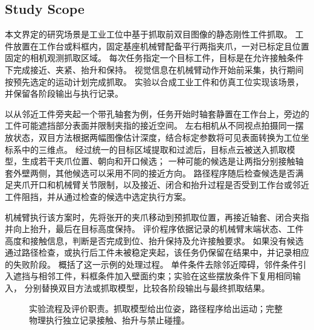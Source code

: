 \documentclass[UTF8,fontset=fandol,a4paper,11pt]{ctexart}
\newcommand{\qyb}[1]{\textcolor{red!75!black}{#1}}
\begin{document}
\subsection{\qyb{Study Scope}}

本文界定的研究场景是工业工位中基于抓取前双目图像的静态刚性工件抓取。
工件放置在工作台或料框内，固定基座机械臂配备平行两指夹爪，一对已标定且位置固定的相机观测抓取区域。
每次任务指定一个目标工件，目标是在允许接触条件下完成接近、夹紧、抬升和保持。
视觉信息在机械臂动作开始前采集，执行期间按预先选定的运动计划完成抓取。
实验以合成工业工件和仿真工位实现该场景，并保留各阶段输出与执行记录。

以从邻近工件旁夹起一个带孔轴套为例，任务开始时轴套静置在工作台上，旁边的工件可能遮挡部分表面并限制夹指的接近空间。
左右相机从不同视点拍摄同一摆放状态，双目方法根据两幅图像估计深度，结合标定参数将可见表面转换为工位坐标系中的三维点。
经过统一的目标区域提取和过滤后，目标点云被送入抓取模型，生成若干夹爪位置、朝向和开口候选；
一种可能的候选是让两指分别接触轴套外壁两侧，其他候选可以采用不同的接近方向。
路径程序随后检查候选是否满足夹爪开口和机械臂关节限制，以及接近、闭合和抬升过程是否受到工作台或邻近工件阻挡，并从通过检查的候选中选定执行方案。

机械臂执行该方案时，先将张开的夹爪移动到预抓取位置，再接近轴套、闭合夹指并向上抬升，最后在目标高度保持。
评价程序依据记录的机械臂末端状态、工件高度和接触信息，判断是否完成到位、抬升保持及允许接触要求。
如果没有候选通过路径检查，或执行后工件未被稳定夹起，该任务仍保留在结果中，并记录相应的失败阶段。
概括了这一示例的处理过程。
单件条件去除邻近障碍，邻件条件引入遮挡与相邻工件，料框条件加入壁面约束；实验在这些摆放条件下复用相同输入，
分别替换双目方法或抓取模型，比较各阶段输出与最终抓取结果。

\begin{figure}[H]
\centering
{}
\caption{实验流程及评价职责。抓取模型给出位姿，路径程序给出运动；完整物理执行独立记录接触、抬升与禁止碰撞。}
\label{fig:pipeline}
\end{figure}
\end{document}
